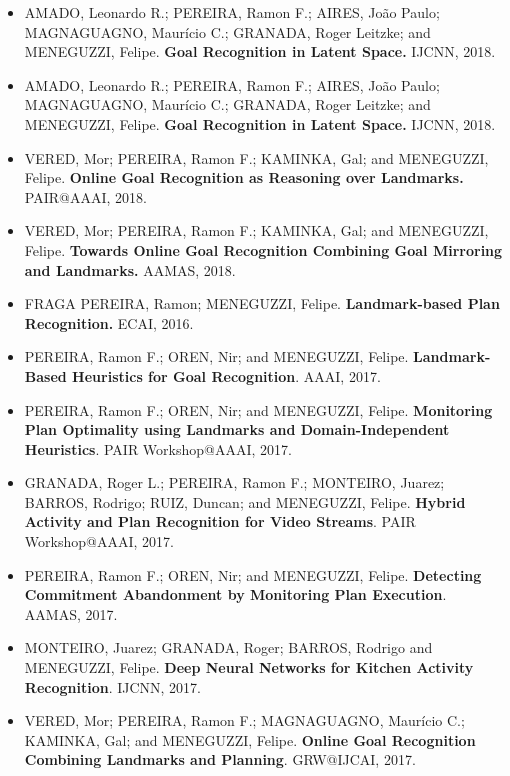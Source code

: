 \documentclass[usenames,dvipsnames]{beamer}
\begin{document}
\begin{frame}[c, allowframebreaks]
\begin{itemize}
	\item[] AMADO, Leonardo R.; PEREIRA, Ramon F.; AIRES, João Paulo; MAGNAGUAGNO, Maurício C.; GRANADA, Roger Leitzke; and MENEGUZZI, Felipe. \textbf{Goal Recognition in Latent Space.} IJCNN, 2018.
	\item[] AMADO, Leonardo R.; PEREIRA, Ramon F.; AIRES, João Paulo; MAGNAGUAGNO, Maurício C.; GRANADA, Roger Leitzke; and MENEGUZZI, Felipe. \textbf{Goal Recognition in Latent Space.} IJCNN, 2018.
	\item[] VERED, Mor; PEREIRA, Ramon F.; KAMINKA, Gal; and MENEGUZZI, Felipe. \textbf{Online Goal Recognition as Reasoning over Landmarks.} PAIR@AAAI, 2018.
	\item[] VERED, Mor; PEREIRA, Ramon F.; KAMINKA, Gal; and MENEGUZZI, Felipe. \textbf{Towards Online Goal Recognition Combining Goal Mirroring and Landmarks.} AAMAS, 2018.
	\framebreak
	\item[] FRAGA PEREIRA, Ramon; MENEGUZZI, Felipe. \textbf{Landmark-based Plan Recognition.} ECAI, 2016.
	\item[] PEREIRA, Ramon F.; OREN, Nir; and MENEGUZZI, Felipe. \textbf{Landmark-Based Heuristics for Goal Recognition}. AAAI, 2017.
	\item[] PEREIRA, Ramon F.; OREN, Nir; and MENEGUZZI, Felipe. \textbf{Monitoring Plan Optimality using Landmarks and Domain-Independent Heuristics}. PAIR Workshop@AAAI, 2017.
    \item[] GRANADA, Roger L.; PEREIRA, Ramon F.; MONTEIRO, Juarez; BARROS, Rodrigo; RUIZ, Duncan; and MENEGUZZI, Felipe. \textbf{Hybrid Activity and Plan Recognition for Video Streams}. PAIR Workshop@AAAI, 2017.
    \item[] PEREIRA, Ramon F.; OREN, Nir; and MENEGUZZI, Felipe. \textbf{Detecting Commitment Abandonment by Monitoring Plan Execution}. AAMAS, 2017.
    \item[] MONTEIRO, Juarez; GRANADA, Roger; BARROS, Rodrigo and MENEGUZZI, Felipe. \textbf{Deep Neural Networks for Kitchen Activity Recognition}. IJCNN, 2017.
    \item[] VERED, Mor; PEREIRA, Ramon F.; MAGNAGUAGNO, Maurício C.; KAMINKA, Gal; and MENEGUZZI, Felipe. \textbf{Online Goal Recognition Combining Landmarks and Planning}. GRW@IJCAI, 2017.
	\end{itemize}
\end{frame}
\end{document}
